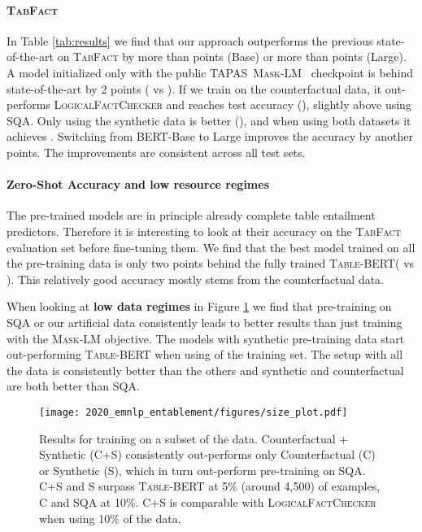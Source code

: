 \documentclass[11pt,a4paper]{article}
\newcommand{\sqa}{\textsc{SQA}\xspace}
\newcommand{\tabfact}{\textsc{TabFact}\xspace}
\newcommand\sota{state-of-the-art\xspace}
\newcommand{\tapas}{\textsc{TAPAS}\xspace}
\newcommand{\bert}{\textsc{BERT}\xspace}
\newcommand{\tablebert}{\textsc{Table-BERT}\xspace}
\newcommand{\lfc}{\textsc{LogicalFactChecker}\xspace}
\newcommand{\masklm}{\textsc{Mask-LM}\xspace}
\theoremstyle{definition}
\begin{document}
\paragraph{\tabfact{}}

In Table \ref{tab:results} we find that our approach outperforms the previous \sota{} on \tabfact{} by more than  points (Base) or more than  points (Large).
A model initialized only with the public \tapas{}~\masklm{}~ checkpoint is behind \sota{} by 2 points ( vs ).
If we train on the counterfactual data, it out-performs \lfc{} and reaches  test accuracy (), slightly above using \sqa{}. 
Only using the synthetic data is better (),
and when using both datasets it achieves .
Switching from \bert{}-Base to Large improves the accuracy by another  points.
The improvements are consistent across all test sets.





\paragraph{Zero-Shot Accuracy and low resource regimes}

The pre-trained models are in principle already complete table entailment predictors.
Therefore it is interesting to look at their accuracy on the \tabfact{} evaluation set before fine-tuning them. 
We find that the best model trained on all the pre-training data is only two points behind the fully trained \tablebert ( vs ).
This relatively good accuracy mostly stems from the counterfactual data.

When looking at \textbf{low data regimes} in Figure \ref{fig:result-train-size} we find that
pre-training on \sqa or our artificial data consistently leads to better results than just training with the \masklm{} objective.
The models with synthetic pre-training data start out-performing \tablebert when using  of the training set.
The setup with all the data is consistently better than the others and synthetic and counterfactual are both better than \sqa.

\begin{figure}[!t]
\texttt{[image: 2020\_emnlp\_entablement/figures/size\_plot.pdf]}
\caption{Results for training on a subset of the data. Counterfactual + Synthetic (C+S) consistently out-performs only Counterfactual (C) or Synthetic (S), which in turn out-perform pre-training on \sqa. C+S and S surpass \tablebert{} at 5\% (around 4,500) of examples, C and \sqa at 10\%.
C+S is comparable with \lfc when using 10\% of the data. }
\label{fig:result-train-size}
\end{figure}
\end{document}
